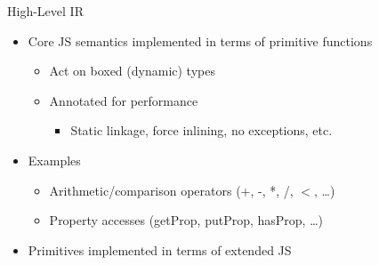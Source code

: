 \begin{frame}{High-Level IR}
    \begin{itemize}
        \item Core JS semantics implemented in terms of primitive functions
        \begin{itemize}
            \item Act on boxed (dynamic) types
            \item Annotated for performance
                \begin{itemize}
                    \item Static linkage, force inlining, no exceptions, etc.
                \end{itemize}
        \end{itemize}

        \item Examples
        \begin{itemize}
            \item Arithmetic/comparison operators (+, -, *, /, $<$, \ldots)
            \item Property accesses (getProp, putProp, hasProp, \ldots)
        \end{itemize}

        \item Primitives implemented in terms of extended JS
    \end{itemize}
\end{frame}

